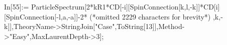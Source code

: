 In[55]:= ParticleSpectrum[2*kR1*CD[-i][SpinConnection[k,l,-k]]*CD[i][SpinConnection[-l,a,-a]]-2* (*omitted 2229 characters for brevity*) ,k,-k]],TheoryName->StringJoin["Case",ToString[13]],Method->"Easy",MaxLaurentDepth->3];